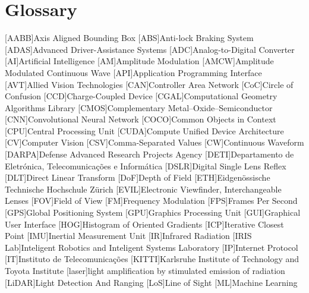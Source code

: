 \chapter{Glossary}

\footnotesize
\SingleSpacing

\begin{multicols}{2} 
\begin{acronym}[AAAAAA]
	[AABB]{Axis Aligned Bounding Box}
	[ABS]{Anti-lock Braking System}
	[ADAS]{Advanced Driver-Assistance Systems}
	[ADC]{Analog-to-Digital Converter}
	[AI]{Artificial Intelligence}
	[AM]{Amplitude Modulation}
	[AMCW]{Amplitude Modulated Continuous Wave}
	[API]{Application Programming Interface}
	[AVT]{Allied Vision Technologies}
	[CAN]{Controller Area Network} 
	[CoC]{Circle of Confusion}
	[CCD]{Charge-Coupled Device}
	[CGAL]{Computational Geometry Algorithms Library}
	[CMOS]{Complementary Metal–Oxide–Semiconductor}
	[CNN]{Convolutional Neural Network}
	[COCO]{Common Objects in Context}
	[CPU]{Central Processing Unit}
	[CUDA]{Compute Unified Device Architecture}
	[CV]{Computer Vision}
	[CSV]{Comma-Separated Values}
	[CW]{Continuous Waveform}
	[DARPA]{Defense Advanced Research Projects Agency}
	[DETI]{Departamento de Eletrónica, Telecomunicações e Informática}
	[DSLR]{Digital Single Lens Reflex}
	[DLT]{Direct Linear Transform}
	[DoF]{Depth of Field}
	[ETH]{Eidgenössische Technische Hochschule Zürich}
	[EVIL]{Electronic Viewfinder, Interchangeable Lenses}
	[FOV]{Field of View}
	[FM]{Frequency Modulation}
	[FPS]{Frames Per Second}
	[GPS]{Global Positioning System}
	[GPU]{Graphics Processing Unit}
	[GUI]{Graphical User Interface}
	[HOG]{Histogram of Oriented Gradients}
	[ICP]{Iterative Closest Point}
	[IMU]{Inertial Measurement Unit}
	[IR]{Infrared Radiation}
	[IRIS Lab]{Inteligent Robotics and Inteligent Systems Laboratory}
	[IP]{Internet Protocol}
	[IT]{Instituto de Telecomunicações}
	[KITTI]{Karlsruhe Institute of Technology and Toyota Institute}
	[laser]{light amplification by stimulated emission of radiation}
	[LiDAR]{Light Detection And Ranging}
	[LoS]{Line of Sight}
	[ML]{Machine Learning}

\end{acronym}
\end{multicols}
